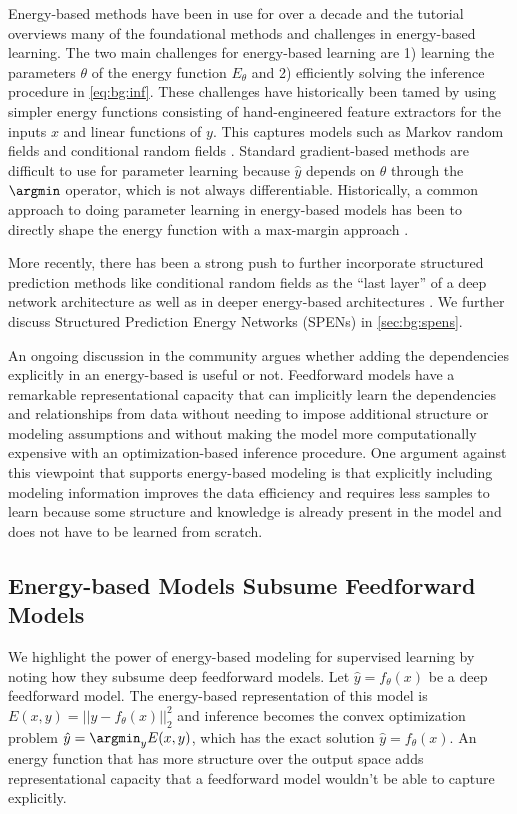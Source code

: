 Energy-based methods have been in use for over a decade
and the tutorial \citet{lecun2006tutorial} overviews
many of the foundational methods and challenges
in energy-based learning.
The two main challenges for energy-based learning are
1) learning the parameters $\theta$ of the energy
function $E_\theta$ and 2) efficiently solving
the inference procedure in \cref{eq:bg:inf}.
These challenges have historically been tamed by
using simpler energy functions consisting of
hand-engineered feature extractors for the inputs
$x$ and linear functions of $y$.
This captures models such as Markov random fields
\citep{li1994markov}
and conditional random fields
\citep{lafferty2001conditional,sutton2012introduction}.
Standard gradient-based methods are difficult to use
for parameter learning because $\hat y$ depends on $\theta$
through the $\argmin$ operator, which is not always differentiable.
Historically, a common approach to doing parameter learning
in energy-based models has been to directly shape the
energy function with a max-margin approach
\citet{taskar2004max,taskar2005learning}.

More recently, there has been a strong push to further incorporate
structured prediction methods like conditional random fields as the
``last layer'' of a deep network architecture
\citep{peng2009conditional,zheng2015conditional,chen2015learning}
as well as in deeper energy-based architectures
\citep{belanger2016structured,belanger2017end,belanger2017deep,wang2016proximal}.
We further discuss Structured Prediction Energy Networks (SPENs)
in \cref{sec:bg:spens}.

An ongoing discussion in the community argues whether
adding the dependencies explicitly in an energy-based is useful or not.
Feedforward models have a remarkable representational
capacity that can implicitly learn the dependencies and
relationships from data without needing to impose
additional structure or modeling assumptions and
without making the model more computationally
expensive with an optimization-based inference procedure.
One argument against this viewpoint that supports
energy-based modeling is that explicitly including
modeling information improves the data efficiency
and requires less samples to learn because some
structure and knowledge is already present in the model
and does not have to be learned from scratch.

\subsection{Energy-based Models Subsume Feedforward Models}
\label{sec:bg:ff-energy}
We highlight the power of energy-based modeling for supervised
learning by noting how they subsume deep feedforward models.
Let $\hat y = f_\theta(x)$ be a deep feedforward model.
The energy-based representation of this model is
$E(x,y) = ||y-f_\theta(x)||_2^2$
and inference becomes the convex optimization problem
$\hat y = \argmin_y E(x,y)$, which
has the exact solution $\hat y = f_\theta(x)$.
An energy function that has more structure over the output
space adds representational capacity that a feedforward
model wouldn't be able to capture explicitly.

